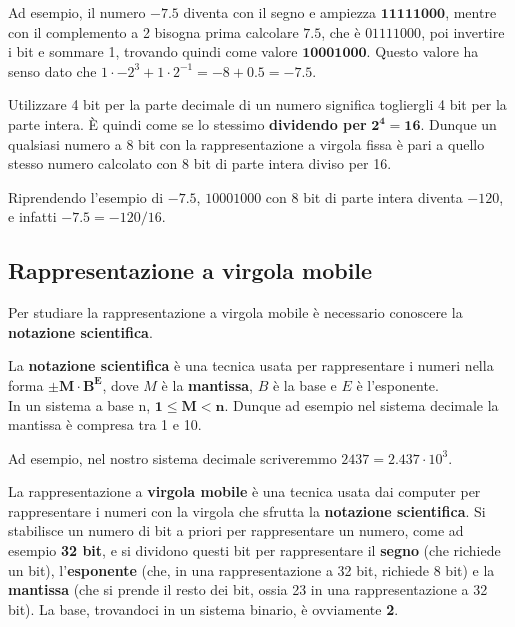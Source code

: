 \documentclass[11pt, a4paper, titlepage, oneside]{scrbook}
\begin{document}
Ad esempio, il numero $-7.5$ diventa con il segno e ampiezza $\bm{11111000}$, mentre con il complemento a 2 bisogna prima calcolare $7.5$, che è $01111000$, poi invertire i bit e sommare 1, trovando quindi come valore $\bm{10001000}$. Questo valore ha senso dato che $1 \cdot -2^3 + 1 \cdot 2^{-1} = -8 + 0.5 = -7.5$.

\begin{Proposizione}[]
\label{propos-numeri-decimali}
Utilizzare 4 bit per la parte decimale di un numero significa togliergli 4 bit per la parte intera. È quindi come se lo stessimo \textbf{dividendo per} $\bm{2^4 = 16}$. Dunque un qualsiasi numero a 8 bit con la rappresentazione a virgola fissa è pari a quello stesso numero calcolato con 8 bit di parte intera diviso per 16.
\end{Proposizione}
Riprendendo l'esempio di $-7.5$, $10001000$ con 8 bit di parte intera diventa $-120$, e infatti $-7.5 = -120/16$.

\subsection{Rappresentazione a virgola mobile}

Per studiare la rappresentazione a virgola mobile è necessario conoscere la \textbf{notazione scientifica}.

\begin{Definizione}
\label{def-notazione-scientifica}
La \textbf{notazione scientifica} è una tecnica usata per rappresentare i numeri nella forma $\bm{\pm M \cdot B^E}$, dove $M$ è la \textbf{mantissa}, $B$ è la base e $E$ è l'esponente. \\
\NB In un sistema a base n, $\bm{1 \leq M < n}$. Dunque ad esempio nel sistema decimale la mantissa è compresa tra 1 e 10.
\end{Definizione}

Ad esempio, nel nostro sistema decimale scriveremmo $2437 = 2.437 \cdot 10^3$. 

\begin{Proprieta}
\label{prop-rappresentazione-virgola-mobile}
La rappresentazione a \textbf{virgola mobile} è una tecnica usata dai computer per rappresentare i numeri con la virgola che sfrutta la \textbf{notazione scientifica}. Si stabilisce un numero di bit a priori per rappresentare un numero, come ad esempio \textbf{32 bit}, e si dividono questi bit per rappresentare il \textbf{segno} (che richiede un bit), l'\textbf{esponente} (che, in una rappresentazione a 32 bit, richiede 8 bit) e la \textbf{mantissa} (che si prende il resto dei bit, ossia 23 in una rappresentazione a 32 bit). La base, trovandoci in un sistema binario, è ovviamente \textbf{2}.
\end{Proprieta}
\end{document}
